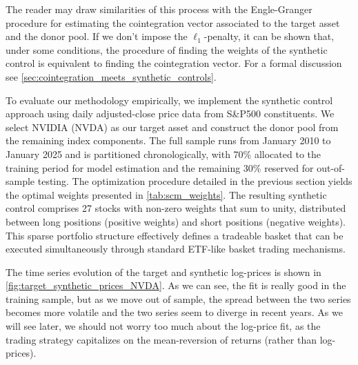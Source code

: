 The reader may draw similarities of this process with the Engle-Granger procedure for estimating the cointegration vector associated to the target asset and the donor pool. If we don't impose the $\ell_1$-penalty, it can be shown that, under some conditions, the procedure of finding the weights of the synthetic control is equivalent to finding the cointegration vector. For a formal discussion see \cref{sec:cointegration_meets_synthetic_controls}.



To evaluate our methodology empirically, we implement the synthetic control approach using daily adjusted-close price data from S\&P500 constituents. We select NVIDIA (NVDA) as our target asset and construct the donor pool from the remaining index components. The full sample runs from January 2010 to January 2025 and is partitioned chronologically, with 70\% allocated to the training period for model estimation and the remaining 30\% reserved for out-of-sample testing. The optimization procedure detailed in the previous section yields the optimal weights presented in \cref{tab:scm_weights}. The resulting synthetic control comprises 27 stocks with non-zero weights that sum to unity, distributed between long positions (positive weights) and short positions (negative weights). This sparse portfolio structure effectively defines a tradeable basket that can be executed simultaneously through standard ETF-like basket trading mechanisms.



The time series evolution of the target and synthetic log-prices is shown in \cref{fig:target_synthetic_prices_NVDA}. As we can see, the fit is really good in the training sample, but as we move out of sample, the spread between the two series becomes more volatile and the two series seem to diverge in recent years. As we will see later, we should not worry too much about the log-price fit, as the trading strategy capitalizes on the mean-reversion of returns (rather than log-prices).

